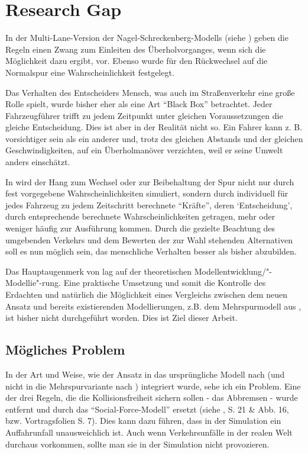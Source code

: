 \section{Research Gap}
\label{sec:researchgap}

In der Multi-Lane-Version der Nagel-Schreckenberg-Modells (siehe \cite{multi-lane}) geben die Regeln einen Zwang zum Einleiten des Überholvorganges, wenn sich die Möglichkeit dazu ergibt, vor. Ebenso wurde für den Rückwechsel auf die Normalspur eine Wahrscheinlichkeit festgelegt.

Das Verhalten des Entscheiders Mensch, was auch im Straßenverkehr eine große Rolle spielt, wurde bisher eher als eine Art \enquote{Black Box} betrachtet. 
Jeder Fahrzeugführer trifft zu jedem Zeitpunkt unter gleichen Voraussetzungen die gleiche Entscheidung. 
Dies ist aber in der Realität nicht so. 
Ein Fahrer kann z. B. vorsichtiger sein als ein anderer und, trotz des gleichen Abstands und der gleichen Geschwindigkeiten, auf ein Überholmanöver verzichten, weil er seine Umwelt anders einschätzt.

In \cite{dat-ba} wird der Hang zum Wechsel oder zur Beibehaltung der Spur nicht nur durch fest vorgegebene Wahrscheinlichkeiten simuliert, sondern durch individuell für jedes Fahrzeug zu jedem Zeitschritt berechnete \enquote{Kräfte}, deren \enquote*{Entscheidung}, durch entsprechende berechnete Wahrscheinlichkeiten getragen, mehr oder weniger häufig zur Ausführung kommen. 
Durch die gezielte Beachtung des umgebenden Verkehrs und dem Bewerten der zur Wahl stehenden Alternativen soll es nun möglich sein, das menschliche Verhalten besser als bisher abzubilden.

Das Hauptaugenmerk von \cite{dat-ba} lag auf der theoretischen Modellentwicklung/"-Modellie"-rung. 
Eine praktische Umsetzung und somit die Kontrolle des Erdachten und natürlich die Möglichkeit eines Vergleichs zwischen dem neuen Ansatz und bereits existierenden Modellierungen, z.B. dem Mehrspurmodell aus \cite{multi-lane}, ist bisher nicht durchgeführt worden. 
Dies ist Ziel dieser Arbeit.

\subsection*{Mögliches Problem}

In der Art und Weise, wie der Ansatz in das ursprüngliche Modell nach \cite{na-sch} (und nicht in die Mehrspurvariante nach \cite{multi-lane}) integriert wurde, sehe ich ein Problem.
Eine der drei Regeln, die die Kollisionsfreiheit sichern sollen - das Abbremsen - wurde entfernt und durch das \enquote{Social-Force-Modell} ersetzt (siehe \cite{dat-ba}, S. 21 \& Abb. 16, bzw. Vortragsfolien S. 7).
Dies kann dazu führen, dass in der Simulation ein Auffahrunfall unausweichlich ist.
Auch wenn Verkehrsunfälle in der realen Welt durchaus vorkommen, sollte man sie in der Simulation nicht provozieren.

